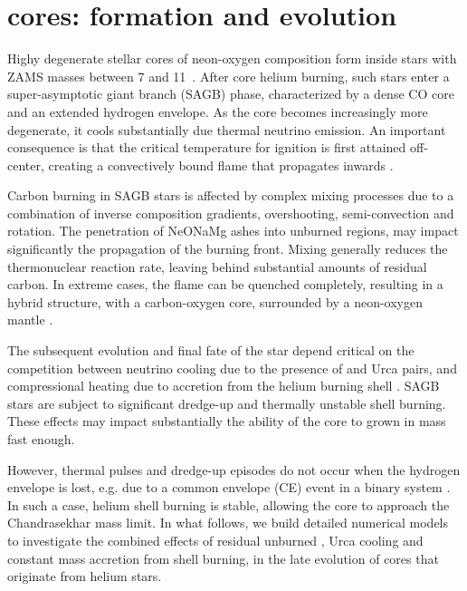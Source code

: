 \documentclass[twocolumn,tighten,times]{aastex62}
\begin{document}
\section{\one cores: formation and evolution}\label{sec:2}
Highy degenerate stellar cores of neon-oxygen composition form inside stars with ZAMS masses  
between  7 and 11\msun\ \citep{Farmer:2015afs,Woosley:2019sdf}. 
After core helium burning, such stars enter a super-asymptotic giant branch 
(SAGB) phase, characterized by a dense CO  
core and an  extended hydrogen envelope.  
As the core becomes increasingly more degenerate, it cools substantially 
due thermal neutrino emission. An important consequence is that the critical 
temperature for  ignition is first attained off-center, creating a 
convectively bound  flame that propagates inwards \citep{siess2006}. 

Carbon burning in SAGB stars is affected by complex mixing processes 
due to a combination of inverse composition gradients, overshooting, 
semi-convection and rotation. The penetration of 
NeONaMg ashes into unburned regions, may impact significantly the propagation of
the burning front. Mixing generally reduces the thermonuclear reaction rate, leaving 
behind substantial amounts of residual carbon. In extreme cases, the flame can be 
quenched completely, resulting in a hybrid structure,  with a carbon-oxygen core, 
surrounded by a neon-oxygen mantle \citep{Denissenkov:2013qaa}. 

The subsequent evolution and final fate of the star depend  critical on the competition 
between neutrino cooling due to the presence of  and 
 Urca pairs, and compressional heating due to accretion from the helium burning shell \citep{Schwab:2017epw}. 
SAGB stars are subject to significant dredge-up  and 
thermally unstable shell burning. 
These effects may impact substantially the ability of the core to grown in mass fast enough. 

However, thermal pulses and dredge-up episodes do not 
occur when the hydrogen envelope 
is lost, e.g. due to a common envelope (CE) event in a binary system \citep{Woosley:2019sdf}.  
In such a case, helium shell burning is stable, allowing  
the core to approach the Chandrasekhar mass limit. 
In what follows, we build detailed numerical models to 
investigate the combined effects 
of residual unburned , Urca cooling and constant mass accretion from shell 
burning, in the late evolution of \one cores that originate from helium stars. 
\end{document}
